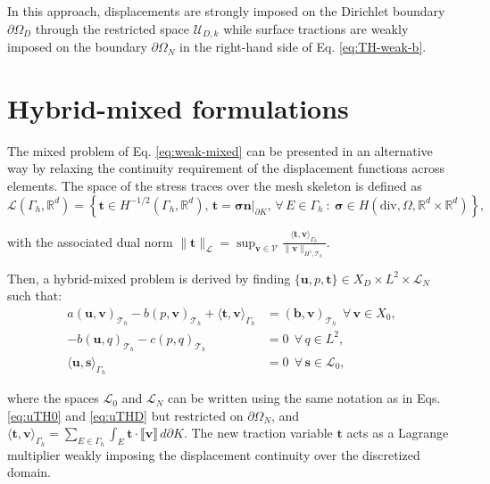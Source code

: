 \documentclass[english,11pt,3p,number,sort&compress]{elsarticle}
\newcommand{\jump}[1]
{
	\llbracket #1 \rrbracket
}
\begin{document}
In this approach, displacements are strongly imposed on the Dirichlet boundary $\partial \Omega_D$ through the restricted space $\mathcal{U}_{D,k}$ while surface tractions are weakly imposed on the boundary $\partial \Omega_N$ in the right-hand side of Eq. \eqref{eq:TH-weak-b}.

\section{Hybrid-mixed formulations}

The mixed problem of Eq. \eqref{eq:weak-mixed} can be presented in an alternative way by relaxing the continuity requirement of the displacement functions across elements. The space of the stress traces over the mesh skeleton is defined as
\begin{equation}
	\label{eq:space-traction}
	\mathcal{L}(\Gamma_h,\mathbb{R}^d) = \left\{\bm{t} \in H^{-1/2}(\Gamma_h,\mathbb{R}^d), \, \bm{t}=\bm{\sigma}\bm{n}\lvert_{\partial K}, \, \forall \, E \in \Gamma_h ~:~\bm{\sigma} \in H(\text{div},\Omega,\mathbb{R}^d \times \mathbb{R}^d) \right\},
\end{equation}

\noindent with the associated dual norm $\lVert\bm{t}\rVert_{\mathcal{L}}=\sup_{\bm{v}\in\mathcal{V}}\frac{\langle\bm{t},\bm{v} \rangle_{\Gamma_h}}{\lVert\bm{v}\rVert_{H^1,\mathcal{T}_h}}$.

Then, a hybrid-mixed problem is derived by finding $\{\bm{u},p,\bm{t}\} \in X_D \times L^2 \times \mathcal{L}_N$ such that:
\begin{subequations} \label{eq:hybrid-weak}
	\begin{align}
		a\left(\bm{u},\bm{v}\right)_{\mathcal{T}_h} - b\left( p, \bm{v}\right)_{\mathcal{T}_h} +\langle\bm{t},\bm{v}\rangle_{\Gamma_h} &= \left(\bm{b},\bm{v}\right)_{\mathcal{T}_h} ~~\forall\, \bm{v} \in X_0,\label{eq:hybrid-weak-a}\\ 
		-b\left(\bm{u}, q\right)_{\mathcal{T}_h} - c\left(p,q \right)_{\mathcal{T}_h} &= 0 ~~\forall\, q \in L^2, \label{eq:hybrid-weak-b}\\
		\langle\bm{u},\bm{s}\rangle_{\Gamma_h} &= 0 ~~\forall\, \bm{s} \in \mathcal{L}_0, \label{eq:hybrid-weak-c}
	\end{align}
\end{subequations}

\noindent where the spaces $\mathcal{L}_0$ and $\mathcal{L}_N$ can be written using the same notation as in Eqs. \eqref{eq:uTH0} and \eqref{eq:uTHD} but restricted on $\partial\Omega_N$, and $\langle\bm{t},\bm{v}\rangle_{\Gamma_h}=\sum_{E \in \Gamma_h}\int_{E} \bm{t} \cdot \jump{\bm{v}} \,d\partial K$. The new traction variable $\bm{t}$ acts as a Lagrange multiplier weakly imposing the displacement continuity over the discretized domain.
\end{document}
